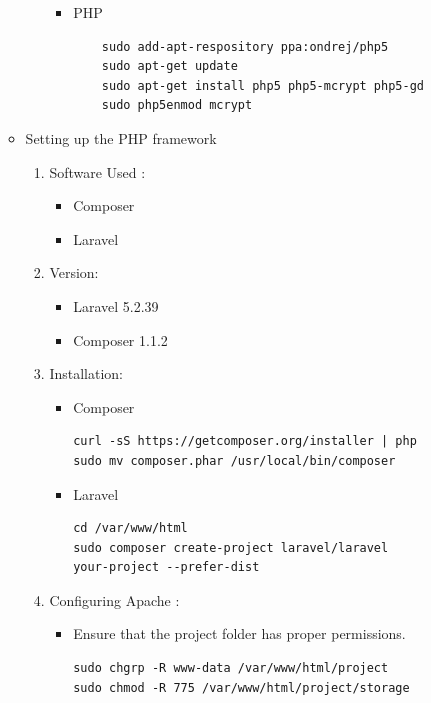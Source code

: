 \documentclass[a4paper,12pt,oneside]{book}
\begin{document}
\begin{enumerate}
\begin{itemize}
\begin{enumerate}
\begin{itemize}
							\item PHP 
							\begin{verbatim}
    sudo add-apt-respository ppa:ondrej/php5
    sudo apt-get update
    sudo apt-get install php5 php5-mcrypt php5-gd
    sudo php5enmod mcrypt
							\end{verbatim}
						\end{itemize}
  				\end{enumerate}
  			\item  Setting up the PHP framework
  				\begin{enumerate}
  					\item Software Used :
  						\begin{itemize}
  							\item Composer 
  							\item Laravel
  						\end{itemize}
  					\item Version:
  						\begin{itemize}
  							\item Laravel 5.2.39
  							\item Composer 1.1.2
  						\end{itemize}
  							
  					\item Installation:
  						\begin{itemize}
  							\item Composer 
      							\begin{verbatim}
curl -sS https://getcomposer.org/installer | php
sudo mv composer.phar /usr/local/bin/composer
      							\end{verbatim}
  							\item Laravel 
  							    \begin{verbatim}
cd /var/www/html
sudo composer create-project laravel/laravel 
your-project --prefer-dist
  							    \end{verbatim}
  						\end{itemize}
  					\item Configuring Apache :
  						\begin{itemize}
  							\item Ensure that the project folder has proper permissions. 
  							    \begin{verbatim}
sudo chgrp -R www-data /var/www/html/project
sudo chmod -R 775 /var/www/html/project/storage
  							    \end{verbatim}
  						

\end{itemize}
\end{enumerate}
\end{itemize}
\end{enumerate}
\end{document}

